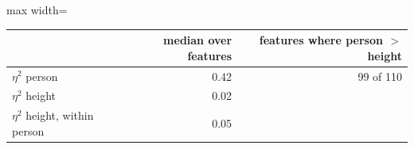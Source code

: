 \begin{adjustbox}{max width=\textwidth}
{\footnotesize
\begin{tabular}{p{5cm}rr}
\toprule
\textbf{} & \textbf{median over features} & \textbf{features where person $>$ height} \\
\midrule
$\eta^2$ person & 0.42 & 99 of 110 \\
$\eta^2$ height & 0.02 &  \\
$\eta^2$ height, within person & 0.05 &  \\
\bottomrule
\end{tabular}
}
\end{adjustbox}

